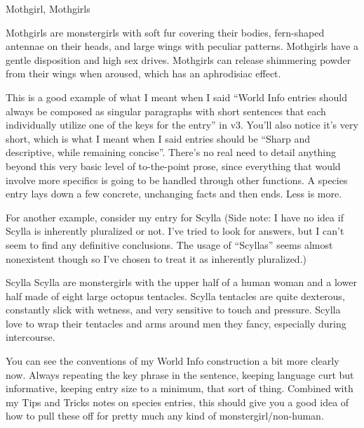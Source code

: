 \documentclass[Source-main.tex]{subfiles}
\begin{document}
\begin{WIbox}{Mothgirl, Mothgirls}

Mothgirls are monstergirls with soft fur covering their bodies, fern-shaped antennae on their heads, and large wings with peculiar patterns.
Mothgirls have a gentle disposition and high sex drives.
Mothgirls can release shimmering powder from their wings when aroused, which has an aphrodisiac effect.

\end{WIbox}
This is a good example of what I meant when I said “World Info entries should always be composed as singular paragraphs with short sentences that each individually utilize one of the keys for the entry” in v3.
You’ll also notice it’s very short, which is what I meant when I said entries should be “Sharp and descriptive, while remaining concise”.
There’s no real need to detail anything beyond this very basic level of to-the-point prose, since everything that would involve more specifics is going to be handled through other functions.
A species entry lays down a few concrete, unchanging facts and then ends.
Less is more.


For another example, consider my entry for Scylla (Side note: I have no idea if Scylla is inherently pluralized or not.
I’ve tried to look for answers, but I can’t seem to find any definitive conclusions.
The usage of “Scyllas” seems almost nonexistent though so I’ve chosen to treat it as inherently pluralized.)

\begin{WIbox}{Scylla}
Scylla are monstergirls with the upper half of a human woman and a lower half made of eight large octopus tentacles.
Scylla tentacles are quite dexterous, constantly slick with wetness, and very sensitive to touch and pressure.
Scylla love to wrap their tentacles and arms around men they fancy, especially during intercourse.

\end{WIbox}

You can see the conventions of my World Info construction a bit more clearly now.
Always repeating the key phrase in the sentence, keeping language curt but informative, keeping entry size to a minimum, that sort of thing.
Combined with my Tips and Tricks notes on species entries, this should give you a good idea of how to pull these off for pretty much any kind of monstergirl/non-human.
\end{document}
